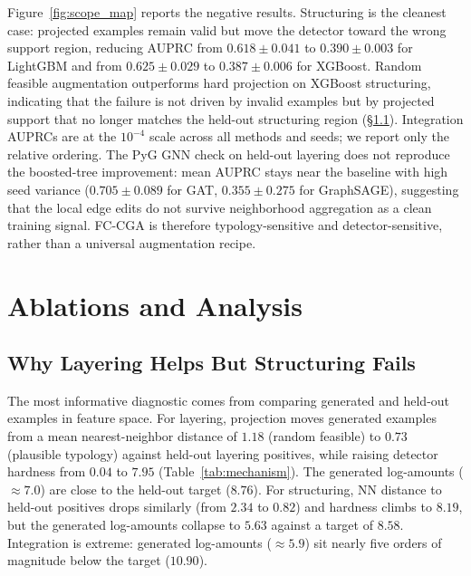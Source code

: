 \documentclass[sigconf,review,anonymous]{acmart}
\newcommand{\fcca}{\textsc{FC-CGA}\xspace}
\begin{document}
Figure~\ref{fig:scope_map} reports the negative results. Structuring is the
cleanest case: projected examples remain valid but move the detector toward
the wrong support region, reducing AUPRC from $0.618{\pm}0.041$ to
$0.390{\pm}0.003$ for LightGBM and from $0.625{\pm}0.029$ to
$0.387{\pm}0.006$ for XGBoost. Random feasible augmentation outperforms hard
projection on XGBoost structuring, indicating that the failure is not driven
by invalid examples but by projected support that no longer matches the
held-out structuring region (\S\ref{subsec:mechanism_layering}). Integration
AUPRCs are at the $10^{-4}$ scale across all methods and seeds; we report
only the relative ordering. The PyG GNN check on held-out layering does not
reproduce the boosted-tree improvement: mean AUPRC stays near the baseline
with high seed variance ($0.705{\pm}0.089$ for GAT, $0.355{\pm}0.275$ for
GraphSAGE), suggesting that the local edge edits do not survive neighborhood
aggregation as a clean training signal. \fcca is therefore
typology-sensitive and detector-sensitive, rather than a universal
augmentation recipe.

\section{Ablations and Analysis}
\label{sec:mechanism}

\subsection{Why Layering Helps But Structuring Fails}
\label{subsec:mechanism_layering}

The most informative diagnostic comes from comparing generated and held-out
examples in feature space. For layering, projection moves generated examples
from a mean nearest-neighbor distance of $1.18$ (random feasible) to $0.73$
(plausible typology) against held-out layering positives, while raising
detector hardness from $0.04$ to $7.95$ (Table~\ref{tab:mechanism}). The
generated log-amounts ($\approx 7.0$) are close to the held-out target
($8.76$). For structuring, NN distance to held-out positives drops similarly
(from $2.34$ to $0.82$) and hardness climbs to $8.19$, but the generated
log-amounts collapse to $5.63$ against a target of $8.58$. Integration is
extreme: generated log-amounts ($\approx 5.9$) sit nearly five orders of
magnitude below the target ($10.90$).
\end{document}
